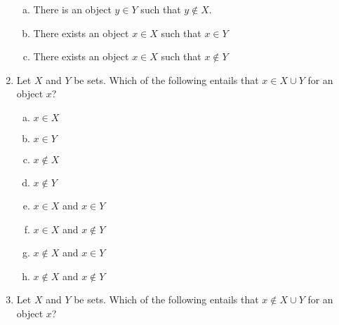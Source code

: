 \begin{enumerate}[\thesection.1]
\begin{enumerate}[(a)]
			\item There is an object $y\in Y$ such that $y\notin X$.
			
			\item There exists an object $x\in X$ such that $x\in Y$
			
			\item There exists an object $x\in X$ such that $x\notin Y$	
					
		\end{enumerate}

		\item Let $X$ and $Y$ be sets. Which of the following entails that $x\in X\cup Y$ for an object $x$?
		
		\begin{minipage}{.5\linewidth}
			\begin{enumerate}[(a)]
		
			\item $x\in X$
			
			\item $x\in Y$			
			
			\item $x\notin X$
			
			\item $x\notin Y$
		\end{enumerate}
		\end{minipage}
		\begin{minipage}{.5\linewidth}
		\begin{enumerate}[(a)]
		\setcounter{enumii}{4}
			
			\item $x\in X$ and $x\in Y$
		
			\item $x\in X$ and $x\notin Y$
			
			\item $x\notin X$ and $x\in Y$
			
			\item $x\notin X$ and $x\notin Y$			
					
		\end{enumerate}
		\end{minipage}
		

		
		\item Let $X$ and $Y$ be sets. Which of the following entails that $x\notin X\cup Y$ for an object $x$?
		
		\begin{minipage}{.5\linewidth}
			\begin{enumerate}[(a)]
		

\end{enumerate}
\end{minipage}
\end{enumerate}
